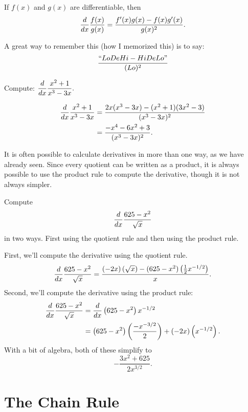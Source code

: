 \begin{theorem}\label{theorem:quotient-rule}
If $f(x)$ and $g(x)$ are differentiable, then
$$\displaystyle\frac{d}{dx} \frac{f(x)}{g(x)} = \frac{f'(x)g(x)-f(x)g'(x)}{g(x)^2}.$$
\end{theorem}

A great way to remember this (how I memorized this) is to say:
$$\dfrac{``LoDeHi-HiDeLo"}{(Lo)^2}$$

\begin{example}
    Compute: $\displaystyle\frac{d}{dx} \frac{x^2+1}{x^3-3x}.$ \cite{mooc}
    
    \begin{solution}
    \begin{align*}
    \displaystyle\frac{d}{dx} \frac{x^2+1}{x^3-3x} &= \frac{2x(x^3-3x)-(x^2+1)(3x^2-3)}{(x^3-3x)^2}\\
    &=\frac{-x^4-6x^2+3}{(x^3-3x)^2}.
    \end{align*}
    \end{solution}
\end{example}
    
It is often possible to calculate derivatives in more than one way, as we have already seen. Since every quotient can be written as a product, it is always possible to use the product rule to compute the derivative, though it is not always simpler. \cite{mooc}
    
\begin{example}
    Compute $$\displaystyle\frac{d}{dx} \frac{625-x^2}{\sqrt{x}}$$
    in two ways. First using the quotient rule and then using the product rule. \cite{mooc}
    
    \begin{solution} 
    First, we'll compute the derivative using the quotient rule. 
    \[
    \displaystyle\frac{d}{dx} \frac{625-x^2}{\sqrt{x}} = \frac{\left(-2x\right)\left(\sqrt{x}\right) - (625-x^2)\left(\frac{1}{2}x^{-1/2}\right)}{x}.
    \]
    Second, we'll compute the derivative using the product rule:
    \begin{align*}
    \displaystyle\frac{d}{dx} \frac{625-x^2}{\sqrt{x}} &= \displaystyle\frac{d}{dx} \left(625-x^2\right)x^{-1/2}\\
    &=\left(625-x^2\right)\left(\frac{-x^{-3/2}}{2}\right)+ (-2x)\left(x^{-1/2}\right).
    \end{align*}
    With a bit of algebra, both of these simplify to
    $$
    -\frac{3x^2+625}{2x^{3/2}}.
    $$
    \end{solution}
\end{example}

\section{The Chain Rule}

